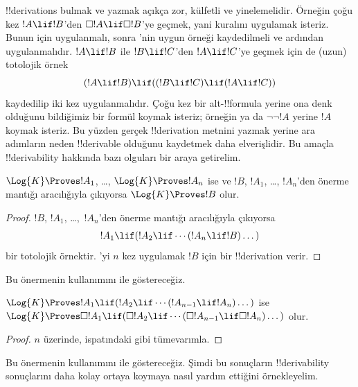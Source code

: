 \documentclass[../../../include/open-logic-section]{subfiles}
\begin{document}


!!{derivation}s bulmak ve yazmak açıkça zor, külfetli ve yinelemelidir.
Örneğin çoğu kez $!A \lif !B$'den $\Box !A \lif \Box !B$'ye geçmek, yani
\RK{} kuralını uygulamak isteriz. Bunun için \Nec{} uygulanmalı, sonra
'nin uygun örneği kaydedilmeli ve ardından \MP{} uygulanmalıdır.
$!A \lif !B$ ile $!B \lif !C$'den $!A \lif !C$'ye geçmek için de (uzun)
totolojik örnek
\[
(!A \lif !B) \lif ((!B \lif !C) \lif (!A \lif !C))
\]
kaydedilip \MP{} iki kez uygulanmalıdır. Çoğu kez bir alt-!!{formula} yerine
ona denk olduğunu bildiğimiz bir formül koymak isteriz; örneğin
 ya da $\lnot\lnot !A$ yerine $!A$ koymak
isteriz. Bu yüzden gerçek !!{derivation} metnini yazmak yerine ara adımların neden
!!{derivable} olduğunu kaydetmek daha elverişlidir. Bu amaçla
!!{derivability} hakkında bazı olguları bir araya getirelim.

\begin{prop}
  $\Log{K} \Proves !A_1$, \dots, $\Log{K} \Proves !A_n$ ise ve $!B$,
  $!A_1$, \dots, $!A_n$'den önerme mantığı aracılığıyla çıkıyorsa
  $\Log{K} \Proves !B$ olur.
\end{prop}

\begin{proof}
  $!B$, $!A_1$, \dots,~$!A_n$'den önerme mantığı aracılığıyla çıkıyorsa
  \[
  !A_1 \lif (!A_2 \lif \cdots (!A_n \lif !B)\dots)
  \]
  bir totolojik örnektir. \MP{}'yi $n$ kez uygulamak $!B$ için bir
  !!{derivation} verir.
\end{proof}

Bu önermenin kullanımını \PL{} ile göstereceğiz.

\begin{prop}
  $\Log{K} \Proves !A_1 \lif (!A_2 \lif \cdots (!A_{n-1} \lif
  !A_n)\dots)$ ise $\Log{K} \Proves \Box !A_1 \lif (\Box !A_2 \lif
  \cdots (\Box !A_{n-1} \lif \Box !A_n)\dots)$ olur.
\end{prop}

\begin{proof}
  $n$ üzerinde,  ispatındaki gibi tümevarımla.
\end{proof}

Bu önermenin kullanımını \RK{} ile göstereceğiz. Şimdi bu sonuçların
!!{derivability} sonuçlarını daha kolay ortaya koymaya nasıl yardım ettiğini
örnekleyelim.
\end{document}
